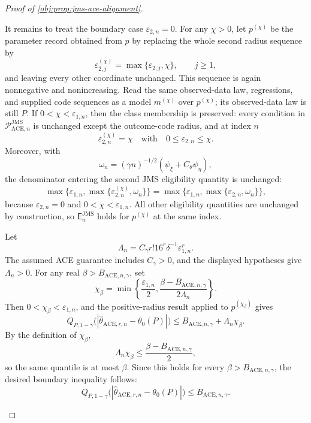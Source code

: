 \documentclass[11pt]{article}
\begin{document}
\begin{proof}[Proof of \cref{obj:prop:jms-ace-alignment}]
\begin{enumerate}
It remains to treat the boundary case \(\varepsilon_{2,n}=0\).  For any
\(\chi>0\), let \(p^{(\chi)}\) be the parameter record obtained from \(p\) by
replacing the whole second radius sequence by
\[
  \varepsilon_{2,j}^{(\chi)}=\max\{\varepsilon_{2,j},\chi\},
  \qquad j\ge1,
\]
and leaving every other coordinate unchanged.  This sequence is again
nonnegative and nonincreasing.  Read the same observed-data law, regressions,
and supplied code sequences as a model \(m^{(\chi)}\) over \(p^{(\chi)}\); its
observed-data law is still \(P\).  If \(0<\chi<\varepsilon_{1,n}\), then the
class membership is preserved: every condition in
\(\mathcal P_{\mathrm{ACE},n}^{\mathrm{JMS}}\) is unchanged except the
outcome-code radius, and at index \(n\)
\[
  \varepsilon_{2,n}^{(\chi)}=\chi
  \quad\text{with}\quad
  0\le \varepsilon_{2,n}\le \chi .
\]
Moreover, with
\[
  \omega_n=(\gamma n)^{-1/2}(\psi_{\xi}+C_{\theta}\psi_{\eta}),
\]
the denominator entering the second JMS eligibility quantity is unchanged:
\[
 \max\{\varepsilon_{1,n},\max\{\varepsilon_{2,n}^{(\chi)},\omega_n\}\}
 =
 \max\{\varepsilon_{1,n},\max\{\varepsilon_{2,n},\omega_n\}\},
\]
because \(\varepsilon_{2,n}=0\) and \(0<\chi<\varepsilon_{1,n}\).  All other
eligibility quantities are unchanged by construction, so
\(\mathsf E_n^{\mathrm{JMS}}\) holds for \(p^{(\chi)}\) at the same index.

Let
\[
  \Lambda_n
  =
  C_{\gamma} r!16^r\delta^{-1}\varepsilon_{1,n}^r .
\]
The assumed ACE guarantee includes \(C_{\gamma}>0\), and the displayed hypotheses
give \(\Lambda_n>0\).  For any real \(\beta>B_{\mathrm{ACE},n,\gamma}\), set
\[
  \chi_{\beta}
  =
  \min\!\left\{
    \frac{\varepsilon_{1,n}}{2},
    \frac{\beta-B_{\mathrm{ACE},n,\gamma}}{2\Lambda_n}
  \right\}.
\]
Then \(0<\chi_{\beta}<\varepsilon_{1,n}\), and the positive-radius result
applied to \(p^{(\chi_{\beta})}\) gives
\[
 Q_{P,1-\gamma}
 \bigl(|\widehat\theta_{\mathrm{ACE},r,n}-\theta_0(P)|\bigr)
 \le
 B_{\mathrm{ACE},n,\gamma}+\Lambda_n\chi_{\beta}.
\]
By the definition of \(\chi_{\beta}\),
\[
  \Lambda_n\chi_{\beta}
  \le
  \frac{\beta-B_{\mathrm{ACE},n,\gamma}}{2},
\]
so the same quantile is at most \(\beta\).  Since this holds for every
\(\beta>B_{\mathrm{ACE},n,\gamma}\), the desired boundary inequality follows:
\[
 Q_{P,1-\gamma}
 \bigl(|\widehat\theta_{\mathrm{ACE},r,n}-\theta_0(P)|\bigr)
 \le B_{\mathrm{ACE},n,\gamma}.
\]


\end{enumerate}
\end{proof}
\end{document}
